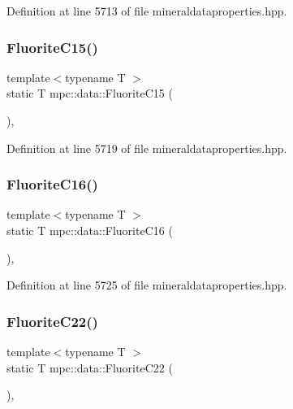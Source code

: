 Definition at line 5713 of file mineraldataproperties.\+hpp.

\mbox{\label{namespacempc_1_1data_adc34a2eb4f5d14f478baa0ae397314d6}} 
\subsubsection{\texorpdfstring{Fluorite\+C15()}{FluoriteC15()}}
{\footnotesize\ttfamily template$<$typename T $>$ \\
static T mpc\+::data\+::\+Fluorite\+C15 (\begin{DoxyParamCaption}{ }\end{DoxyParamCaption})\hspace{0.3cm}{\ttfamily [inline]}, {\ttfamily [static]}}



Definition at line 5719 of file mineraldataproperties.\+hpp.

\mbox{\label{namespacempc_1_1data_a12d296d9931fbb5a94b9d4f097b96071}} 
\subsubsection{\texorpdfstring{Fluorite\+C16()}{FluoriteC16()}}
{\footnotesize\ttfamily template$<$typename T $>$ \\
static T mpc\+::data\+::\+Fluorite\+C16 (\begin{DoxyParamCaption}{ }\end{DoxyParamCaption})\hspace{0.3cm}{\ttfamily [inline]}, {\ttfamily [static]}}



Definition at line 5725 of file mineraldataproperties.\+hpp.

\mbox{\label{namespacempc_1_1data_ad9e0a89ea7bfcd8a5c59b0991e55fa31}} 
\subsubsection{\texorpdfstring{Fluorite\+C22()}{FluoriteC22()}}
{\footnotesize\ttfamily template$<$typename T $>$ \\
static T mpc\+::data\+::\+Fluorite\+C22 (\begin{DoxyParamCaption}{ }\end{DoxyParamCaption})\hspace{0.3cm}{\ttfamily [inline]}, {\ttfamily [static]}}



